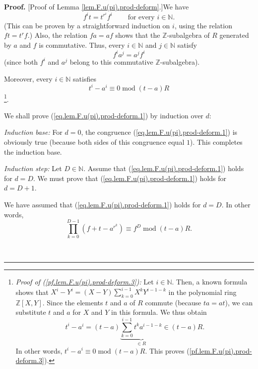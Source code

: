 \documentclass[numbers=enddot,12pt,final,onecolumn,notitlepage]{scrartcl}%
\theoremstyle{definition}
\newenvironment{proof}[1][Proof]{\noindent\textbf{#1.} }{\ \rule{0.5em}{0.5em}}
\let\sumnonlimits\sum
\let\prodnonlimits\prod
\renewcommand{\sum}{\sumnonlimits\limits}
\renewcommand{\prod}{\prodnonlimits\limits}
\begin{document}
\begin{proof}
[Proof of Lemma \ref{lem.F.u(pi).prod-deform}.]We have%
\begin{equation}
f^{i}t=t^{r^{i}}f^{i}\ \ \ \ \ \ \ \ \ \ \text{for every }i\in\mathbb{N}.
\label{pf.lem.F.u(pi).prod-deform.1}%
\end{equation}
(This can be proven by a straightforward induction on $i$, using the relation
$ft=t^{r}f$.) Also, the relation $fa=af$ shows that the $\mathbb{Z}%
$-subalgebra of $R$ generated by $a$ and $f$ is commutative. Thus, every
$i\in\mathbb{N}$ and $j\in\mathbb{N}$ satisfy%
\begin{equation}
f^{i}a^{j}=a^{j}f^{i} \label{pf.lem.F.u(pi).prod-deform.2}%
\end{equation}
(since both $f^{i}$ and $a^{j}$ belong to this commutative $\mathbb{Z}$-subalgebra).

Moreover, every $i\in\mathbb{N}$ satisfies%
\begin{equation}
t^{i}-a^{i}\equiv0\operatorname{mod}\left(  t-a\right)  R
\label{pf.lem.F.u(pi).prod-deform.3}%
\end{equation}
\footnote{\textit{Proof of (\ref{pf.lem.F.u(pi).prod-deform.3}):} Let
$i\in\mathbb{N}$. Then, a known formula shows that $X^{i}-Y^{i}=\left(
X-Y\right)  \sum_{k=0}^{i-1}X^{k}Y^{i-1-k}$ in the polynomial ring
$\mathbb{Z}\left[  X,Y\right]  $. Since the elements $t$ and $a$ of $R$
commute (because $ta=at$), we can substitute $t$ and $a$ for $X$ and $Y$ in
this formula. We thus obtain%
\[
t^{i}-a^{i}=\left(  t-a\right)  \underbrace{\sum_{k=0}^{i-1}t^{k}a^{i-1-k}%
}_{\in R}\in\left(  t-a\right)  R.
\]
In other words, $t^{i}-a^{i}\equiv0\operatorname{mod}\left(  t-a\right)  R$.
This proves (\ref{pf.lem.F.u(pi).prod-deform.3}).}.

We shall prove (\ref{eq.lem.F.u(pi).prod-deform.1}) by induction over $d$:

\textit{Induction base:} For $d=0$, the congruence
(\ref{eq.lem.F.u(pi).prod-deform.1}) is obviously true (because both sides of
this congruence equal $1$). This completes the induction base.

\textit{Induction step:} Let $D\in\mathbb{N}$. Assume that
(\ref{eq.lem.F.u(pi).prod-deform.1}) holds for $d=D$. We must prove that
(\ref{eq.lem.F.u(pi).prod-deform.1}) holds for $d=D+1$.

We have assumed that (\ref{eq.lem.F.u(pi).prod-deform.1}) holds for $d=D$. In
other words,%
\begin{equation}
\prod_{k=0}^{D-1}\left(  f+t-a^{r^{k}}\right)  \equiv f^{D}\operatorname{mod}%
\left(  t-a\right)  R. \label{pf.lem.F.u(pi).prod-deform.indhyp}%
\end{equation}



\end{proof}
\end{document}
